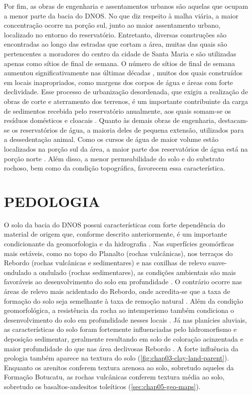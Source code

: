 Por fim, as obras de engenharia e assentamentos urbanos são aquelas que ocupam a menor parte da bacia do DNOS. 
No que diz respeito à malha viária, a maior concentração ocorre na porção sul, junto ao maior assentamento 
urbano, localizado no entorno do reservatório. Entretanto, diversas construções são encontradas ao longo das 
estradas que cortam a área, muitas das quais são pertencentes a moradores do centro da cidade de Santa Maria e 
são utilizadas apenas como sítios de final de semana. O número de sítios de final de semana aumentou 
significativamente nas últimas décadas \cite{Goldani2006}, muitos dos quais construídos em locais 
inapropriados, como margens dos corpos de água e áreas com forte declividade. Esse processo de urbanização 
desordenada, que exigiu a realização de obras de corte e aterramento dos terrenos, é um importante 
contribuinte da carga de sedimentos recebida pelo reservatório anualmente, aos quais somam-se os resíduos 
domésticos e cloacais \cite{Goldani2006, PaivaEtAl2001, DillEtAl2004, MiguelEtAl2014}. Quanto às demais obras 
de engenharia, destacam-se os reservatórios de água, a maioria deles de pequena extensão, utilizados para a 
dessedentação animal. Como os cursos de água de maior volume estão localizados na porção sul da área, a maior 
parte dos reservatórios de água está na porção norte \cite{SamuelRosaEtAl2011a}. Além disso, a menor 
permeabilidade do solo e do substrato rochoso, bem como da condição topográfica, favorecem essa 
característica.

\section{PEDOLOGIA}

O solo da bacia do DNOS possui características com forte dependência do material de origem que, conforme 
descrito anteriormente, é um importante condicionante da geomorfologia e da hidrografia 
\cite{NascimentoEtAl2010}. Nas superfícies geomórficas mais estáveis, como no topo do Planalto (rochas 
vulcânicas), nos terraços do Rebordo (rochas vulcânicas e sedimentares) e nas coxilhas de relevo 
suave-ondulado a ondulado (rochas sedimentares), as condições ambientais são mais favoráveis ao 
desenvolvimento do solo em profundidade \cite{Moser1990}. O contrário ocorre nas áreas de relevo mais 
acidentado do Rebordo, onde acredita-se que a taxa de formação do solo seja semelhante à taxa de remoção 
natural \cite{Moser1990, DalmolinEtAl2006a, Sturmer2008, SamuelRosaEtAl2011a}. Além da condição 
geomorfológica, a resistência da rocha ao intemperismo também condiciona o desenvolvimento do solo em 
profundidade nesses locais \cite{Pedron2007}. Já nas planícies aluviais, as características do solo foram 
fortemente influenciadas pelo hidromorfismo e deposição sedimentar, geralmente resultando em solo de coloração 
acinzentada e maior profundidade do que nas área declivosas Rebordo \cite{Moser1990, Miguel2010}. A forte 
influência da geologia também aparece na textura do solo (\autoref{fig:chap03-clay-land-parent}). Enquanto os 
arenitos conferem textura arenosa ao solo, sobretudo aqueles da Formação Botucatu, as rochas vulcânicas 
conferem textura média ao solo, sobretudo os basaltos-andesitos toleíticos (\autoref{sec:chap05-geo-maps}).

